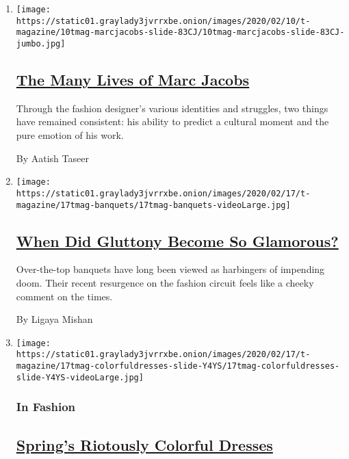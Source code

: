 \begin{enumerate}
\def\labelenumi{\arabic{enumi}.}
\item
  \texttt{[image: https://static01.graylady3jvrrxbe.onion/images/2020/02/10/t-magazine/10tmag-marcjacobs-slide-83CJ/10tmag-marcjacobs-slide-83CJ-jumbo.jpg]}

  \hypertarget{the-many-lives-of-marc-jacobs}{%
  \subsection{\texorpdfstring{\href{/2020/02/10/t-magazine/marc-jacobs.html}{The
  Many Lives of Marc
  Jacobs}}{The Many Lives of Marc Jacobs}}\label{the-many-lives-of-marc-jacobs}}

  Through the fashion designer's various identities and struggles, two
  things have remained consistent: his ability to predict a cultural
  moment and the pure emotion of his work.

  By Aatish Taseer
\item
  \texttt{[image: https://static01.graylady3jvrrxbe.onion/images/2020/02/17/t-magazine/17tmag-banquets/17tmag-banquets-videoLarge.jpg]}

  \hypertarget{when-did-gluttony-become-so-glamorous}{%
  \subsection{\texorpdfstring{\href{/2020/02/21/t-magazine/fashion-banquets.html}{When
  Did Gluttony Become So
  Glamorous?}}{When Did Gluttony Become So Glamorous?}}\label{when-did-gluttony-become-so-glamorous}}

  Over-the-top banquets have long been viewed as harbingers of impending
  doom. Their recent resurgence on the fashion circuit feels like a
  cheeky comment on the times.

  By Ligaya Mishan
\item
  \texttt{[image: https://static01.graylady3jvrrxbe.onion/images/2020/02/17/t-magazine/17tmag-colorfuldresses-slide-Y4YS/17tmag-colorfuldresses-slide-Y4YS-videoLarge.jpg]}

  \hypertarget{in-fashion}{%
  \subsubsection{In Fashion}\label{in-fashion}}

  \hypertarget{springs-riotously-colorful-dresses}{%
  \subsection{\texorpdfstring{\href{/2020/02/17/t-magazine/spring-colorful-dresses.html}{Spring's
  Riotously Colorful
  Dresses}}{Spring's Riotously Colorful Dresses}}\label{springs-riotously-colorful-dresses}}


\end{enumerate}
